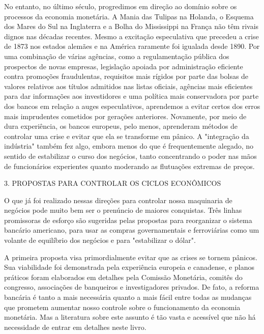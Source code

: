 \documentclass[12pt]{article}
\begin{document}
No entanto, no último século, progredimos em direção ao domínio sobre os processos da economia monetária. A Mania das Tulipas na Holanda, o Esquema dos Mares do Sul na Inglaterra e a Bolha do Mississippi na França não têm rivais dignos nas décadas recentes. Mesmo a excitação especulativa que precedeu a crise de 1873 nos estados alemães e na América raramente foi igualada desde 1890. Por uma combinação de várias agências, como a regulamentação pública dos prospectos de novas empresas, legislação apoiada por administração eficiente contra promoções fraudulentas, requisitos mais rígidos por parte das bolsas de valores relativos aos títulos admitidos nas listas oficiais, agências mais eficientes para dar informações aos investidores e uma política mais conservadora por parte dos bancos em relação a auges especulativos, aprendemos a evitar certos dos erros mais imprudentes cometidos por gerações anteriores. Novamente, por meio de dura experiência, os bancos europeus, pelo menos, aprenderam métodos de controlar uma crise e evitar que ela se transforme em pânico. A "integração da indústria" também fez algo, embora menos do que é frequentemente alegado, no sentido de estabilizar o curso dos negócios, tanto concentrando o poder nas mãos de funcionários experientes quanto moderando as flutuações extremas de preços.

3. PROPOSTAS PARA CONTROLAR OS CICLOS ECONÔMICOS

O que já foi realizado nessas direções para controlar nossa maquinaria de negócios pode muito bem ser o prenúncio de maiores conquistas. Três linhas promissoras de esforço são sugeridas pelas propostas para reorganizar o sistema bancário americano, para usar as compras governamentais e ferroviárias como um volante de equilíbrio dos negócios e para "estabilizar o dólar".

A primeira proposta visa primordialmente evitar que as crises se tornem pânicos. Sua viabilidade foi demonstrada pela experiência europeia e canadense, e planos práticos foram elaborados em detalhes pela Comissão Monetária, comitês do congresso, associações de banqueiros e investigadores privados. De fato, a reforma bancária é tanto a mais necessária quanto a mais fácil entre todas as mudanças que prometem aumentar nosso controle sobre o funcionamento da economia monetária. Mas a literatura sobre este assunto é tão vasta e acessível que não há necessidade de entrar em detalhes neste livro.
\end{document}
